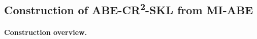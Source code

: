 






















\subsection{Construction of ABE-CR\textsuperscript{2}-SKL from MI-ABE}\label{sec-ABE-CR-SKL-classical-certificate}
\paragraph{Construction overview.}
%



